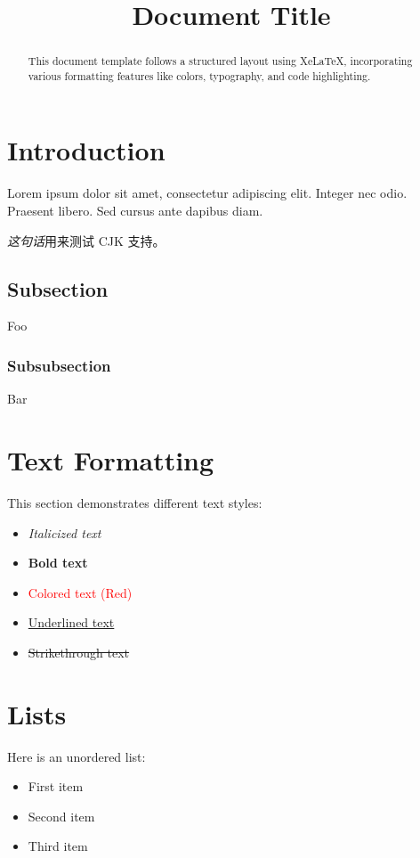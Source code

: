 \documentclass[12pt]{article}
\title{\bfseries \centering Document Title}
\begin{document}
\maketitle

\tableofcontents

\begin{abstract}
This document template follows a structured layout using XeLaTeX, incorporating various formatting features like colors, typography, and code highlighting.
\end{abstract}

\section{Introduction}
Lorem ipsum dolor sit amet, consectetur adipiscing elit. Integer nec odio. Praesent libero. Sed cursus ante dapibus diam.

\textit{这句话}用来测试 CJK 支持。

\subsection{Subsection}

Foo

\subsubsection{Subsubsection}

Bar

\section{Text Formatting}
This section demonstrates different text styles:

\begin{itemize}
    \item \textit{Italicized text}
    \item \textbf{Bold text}
    \item \textcolor{red}{Colored text (Red)}
    \item \uline{Underlined text}
    \item \sout{Strikethrough text}
\end{itemize}

\section{Lists}
Here is an unordered list:
\begin{itemize}
    \item First item
    \item Second item
    \item Third item
\end{itemize}
\end{document}
